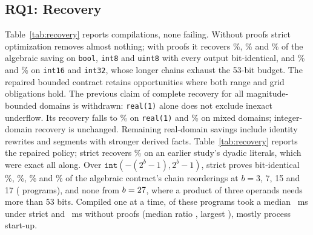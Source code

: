 \documentclass[acmsmall,review,anonymous,nonacm]{acmart}
\begin{document}
\subsection{RQ1: Recovery}
\begin{table}[t]
\caption{RQ1. Modeled arithmetic removed under each contract (pooled over
\RqOnePrograms{} programs, ten seeds, six profiles), and recovery: the share of
the algebraic contract's saving obtained over the unproved strict optimizer.}
\label{tab:recovery}
\centering\footnotesize
\end{table}
Table~\ref{tab:recovery} reports \RqOneCompiles{} compilations, none failing.
Without proofs strict optimization removes almost nothing; with proofs it
recovers \RqOneRecoveryBoolStrict\%, \RqOneRecoveryIntEightStrict\% and
\RqOneRecoveryUintEightStrict\% of the algebraic saving on \texttt{bool},
\texttt{int8} and \texttt{uint8} with every output bit-identical, and
\RqOneRecoveryIntOneSixStrict\% and \RqOneRecoveryIntThreeTwoStrict\% on
\texttt{int16} and \texttt{int32}, whose longer chains exhaust the 53-bit
budget. The repaired bounded contract retains opportunities where both range
and grid obligations hold. The previous claim of complete recovery for all
magnitude-bounded domains is withdrawn: \texttt{real(1)} alone does not
exclude inexact underflow. Its recovery falls to
\RqOneRecoveryRealBounded\% on \texttt{real(1)} and
\RqOneRecoveryMixedBounded\% on mixed domains; integer-domain recovery is
unchanged. Remaining real-domain savings include identity rewrites and
segments with stronger derived facts. Table~\ref{tab:recovery} reports the repaired
policy; strict recovers
\RqOneRecoveryDyadicStrict\% on an earlier study's dyadic literals, which were
exact all along. Over $\mathtt{int}(-(2^b-1), 2^b-1)$, strict proves
bit-identical \RqWidthShareThree\%, \RqWidthShareSeven\%, \RqWidthShareOneFive\%
and \RqWidthShareOneSeven\% of the algebraic contract's chain reorderings at
$b=3$, 7, 15 and 17 (\RqWidthPrograms{} programs), and none from
$b=27$, where a product of three operands needs more than 53 bits.
Compiled one at a time, \RqOverheadPrograms{} of these programs took a median
\RqOverheadStrictMs{}~ms under strict and \RqOverheadNoproofMs{}~ms without
proofs (median ratio \RqOverheadRatio, largest \RqOverheadMaxRatio), mostly
process start-up.
\end{document}
